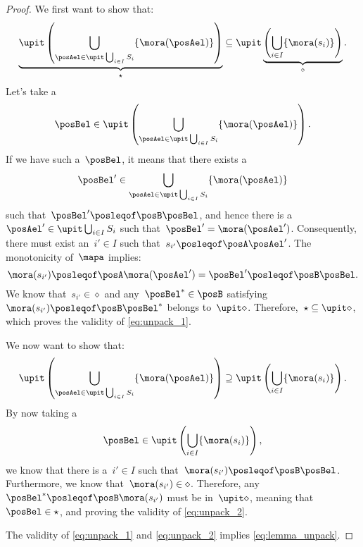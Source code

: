
\begin{proof}
	We first want to show that:
	\begin{equation}
		\label{eq:unpack_1}
		\underbrace{\upit \left(\bigcup_{\posAel \in \upit \bigcup_{i\in I}S_i}\{\mora(\posAel)\} \right)}_{\star}\subseteq \upit \underbrace{\left( \bigcup_{i\in I}\{\mora(s_i)\}\right)}_{\diamond}.
	\end{equation}
	Let's take a
	\begin{equation}
		\posBel \in \upit\left( \bigcup_{\posAel \in \upit \bigcup_{i\in I}S_i}\{\mora(\posAel)\}\right).
	\end{equation}
	If we have such a~$\posBel$, it means that there exists a
	\begin{equation}
		\posBel'\in \bigcup_{\posAel\in \upit\bigcup_{i\in I}S_i}\{\mora(\posAel)\}
	\end{equation}
	such that~$\posBel'\posleqof\posB \posBel$, and hence there is a~$\posAel'\in \upit \bigcup_{i\in I} S_i$ such that~$\posBel'=\mora(\posAel')$.
	Consequently, there must exist an~$i'\in I$ such that~$s_{i'}\posleqof\posA \posAel'$.
	The monotonicity of~$\mapa$ implies:
	\begin{equation}
		\mora(s_{i'})\posleqof\posA \mora(\posAel')=\posBel'\posleqof\posB \posBel.
	\end{equation}
	We know that~$s_{i'}\in \diamond$ and any~$\posBel^*\in \posB$ satisfying~$\mora(s_{i'})\posleqof\posB \posBel^*$ belongs to~$\upit \diamond$.
	Therefore,~$\star\subseteq \upit \diamond$, which proves the validity of \cref{eq:unpack_1}.

	We now want to show that:
	\begin{equation}
		\label{eq:unpack_2}
		\upit \left(\bigcup_{\posAel \in \upit \bigcup_{i\in I}S_i}\{\mora(\posAel)\} \right)\supseteq \upit \left( \bigcup_{i\in I}\{\mora(s_i)\}\right).
	\end{equation}
	By now taking a
	\begin{equation}
		\posBel\in \upit \left( \bigcup_{i\in I}\{\mora(s_i)\}\right),
	\end{equation}
	we know that there is a~$i'\in I$ such that~$\mora(s_{i'})\posleqof\posB \posBel$.
	Furthermore, we know that~$\mora(s_{i'})\in \diamond$.
	Therefore, any~$\posBel^*\posleqof\posB \mora(s_{i'})$ must be in~$\upit \diamond$, meaning that~$\posBel\in \star$, and proving the validity of \cref{eq:unpack_2}.

	The validity of \cref{eq:unpack_1} and \cref{eq:unpack_2} implies \cref{eq:lemma_unpack}.
\end{proof}

